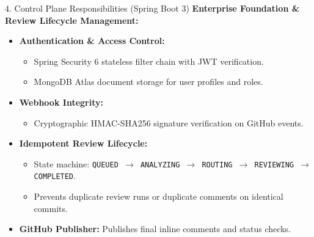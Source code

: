 \documentclass[aspectratio=169,11pt]{beamer}
\begin{document}
\begin{frame}{4. Control Plane Responsibilities (Spring Boot 3)}
  \textbf{Enterprise Foundation \& Review Lifecycle Management:}
  \vspace{0.25cm}
  \begin{itemize}
    \item \textbf{Authentication \& Access Control:}
      \begin{itemize}
        \item Spring Security 6 stateless filter chain with JWT verification.
        \item MongoDB Atlas document storage for user profiles and roles.
      \end{itemize}
    \vspace{0.2cm}
    \item \textbf{Webhook Integrity:}
      \begin{itemize}
        \item Cryptographic HMAC-SHA256 signature verification on GitHub events.
      \end{itemize}
    \vspace{0.2cm}
    \item \textbf{Idempotent Review Lifecycle:}
      \begin{itemize}
        \item State machine: \texttt{\small QUEUED $\rightarrow$ ANALYZING $\rightarrow$ ROUTING $\rightarrow$ REVIEWING $\rightarrow$ COMPLETED}.
        \item Prevents duplicate review runs or duplicate comments on identical commits.
      \end{itemize}
    \vspace{0.2cm}
    \item \textbf{GitHub Publisher:} Publishes final inline comments and status checks.
  \end{itemize}
\end{frame}
\end{document}

